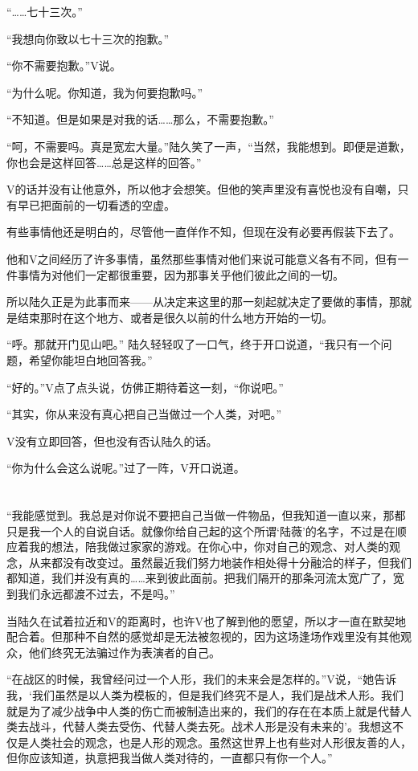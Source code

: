 “……七十三次。”

“我想向你致以七十三次的抱歉。”

“你不需要抱歉。”V说。

“为什么呢。你知道，我为何要抱歉吗。”

“不知道。但是如果是对我的话……那么，不需要抱歉。”

“呵，不需要吗。真是宽宏大量。”陆久笑了一声，“当然，我能想到。即便是道歉，你也会是这样回答……总是这样的回答。”

V的话并没有让他意外，所以他才会想笑。但他的笑声里没有喜悦也没有自嘲，只有早已把面前的一切看透的空虚。

有些事情他还是明白的，尽管他一直佯作不知，但现在没有必要再假装下去了。

他和V之间经历了许多事情，虽然那些事情对他们来说可能意义各有不同，但有一件事情为对他们一定都很重要，因为那事关乎他们彼此之间的一切。

所以陆久正是为此事而来——从决定来这里的那一刻起就决定了要做的事情，那就是结束那时在这个地方、或者是很久以前的什么地方开始的一切。

“呼。那就开门见山吧。” 陆久轻轻叹了一口气，终于开口说道，“我只有一个问题，希望你能坦白地回答我。”

“好的。”V点了点头说，仿佛正期待着这一刻，“你说吧。”

“其实，你从来没有真心把自己当做过一个人类，对吧。”

V没有立即回答，但也没有否认陆久的话。

“你为什么会这么说呢。”过了一阵，V开口说道。

\section*{}

“我能感觉到。我总是对你说不要把自己当做一件物品，但我知道一直以来，那都只是我一个人的自说自话。就像你给自己起的这个所谓‘陆薇’的名字，不过是在顺应着我的想法，陪我做过家家的游戏。在你心中，你对自己的观念、对人类的观念，从来都没有改变过。虽然最近我们努力地装作相处得十分融洽的样子，但我们都知道，我们并没有真的……来到彼此面前。把我们隔开的那条河流太宽广了，宽到我们永远都渡不过去，不是吗。”

当陆久在试着拉近和V的距离时，也许V也了解到他的愿望，所以才一直在默契地配合着。但那种不自然的感觉却是无法被忽视的，因为这场逢场作戏里没有其他观众，他们终究无法骗过作为表演者的自己。

“在战区的时候，我曾经问过一个人形，我们的未来会是怎样的。”V说，“她告诉我，‘我们虽然是以人类为模板的，但是我们终究不是人，我们是战术人形。我们就是为了减少战争中人类的伤亡而被制造出来的，我们的存在在本质上就是代替人类去战斗，代替人类去受伤、代替人类去死。战术人形是没有未来的’。我想这不仅是人类社会的观念，也是人形的观念。虽然这世界上也有些对人形很友善的人，但你应该知道，执意把我当做人类对待的，一直都只有你一个人。”

